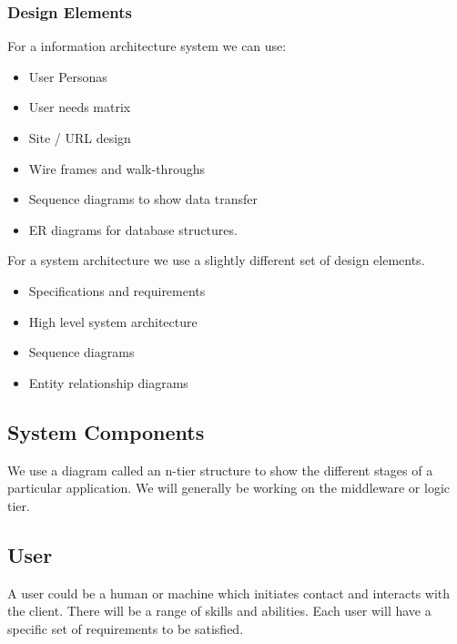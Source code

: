 \subsubsection{Design Elements}\label{ssub:design_elements}

For a information architecture system we can use:
\begin{itemize}
	\item User Personas
	\item User needs matrix
	\item Site / URL design
	\item Wire frames and walk-throughs
	\item Sequence diagrams to show data transfer
	\item ER diagrams for database structures.
\end{itemize}
For a system architecture we use a slightly different set of design elements.
\begin{itemize}
	\item Specifications and requirements
	\item High level system architecture
	\item Sequence diagrams
	\item Entity relationship diagrams
\end{itemize}

\subsection{System Components}\label{sub:system_components}

We use a diagram called an n-tier structure to show the different stages of a particular application.
We will generally be working on the middleware or logic tier.
\begin{center}
\end{center}

\subsection{User}\label{sub:user}

A user could be a human or machine which initiates contact and interacts with the client.
There will be a range of skills and abilities.
Each user will have a specific set of requirements to be satisfied.

